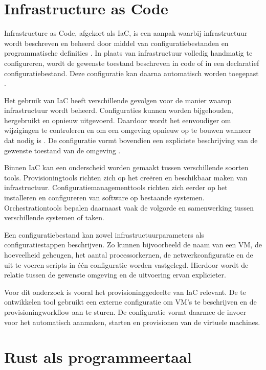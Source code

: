 \section{Infrastructure as Code}

Infrastructure as Code, afgekort als IaC, is een aanpak waarbij infrastructuur wordt beschreven en beheerd door middel van configuratiebestanden en programmatische definities \autocite{Holdsworth2025}. In plaats van infrastructuur volledig handmatig te configureren, wordt de gewenste toestand beschreven in code of in een declaratief configuratiebestand. Deze configuratie kan daarna automatisch worden toegepast \autocite{Holdsworth2025}.

Het gebruik van IaC heeft verschillende gevolgen voor de manier waarop infrastructuur wordt beheerd. Configuraties kunnen worden bijgehouden, hergebruikt en opnieuw uitgevoerd. Daardoor wordt het eenvoudiger om wijzigingen te controleren en om een omgeving opnieuw op te bouwen wanneer dat nodig is \autocite{Holdsworth2025}. De configuratie vormt bovendien een expliciete beschrijving van de gewenste toestand van de omgeving \autocite{Holdsworth2025}.

Binnen IaC kan een onderscheid worden gemaakt tussen verschillende soorten tools. Provisioningtools richten zich op het creëren en beschikbaar maken van infrastructuur. Configuratiemanagementtools richten zich eerder op het installeren en configureren van software op bestaande systemen. Orchestrationtools bepalen daarnaast vaak de volgorde en samenwerking tussen verschillende systemen of taken.

Een configuratiebestand kan zowel infrastructuurparameters als configuratiestappen beschrijven. Zo kunnen bijvoorbeeld de naam van een VM, de hoeveelheid geheugen, het aantal processorkernen, de netwerkconfiguratie en de uit te voeren scripts in één configuratie worden vastgelegd. Hierdoor wordt de relatie tussen de gewenste omgeving en de uitvoering ervan explicieter.

Voor dit onderzoek is vooral het provisioninggedeelte van IaC relevant. De te ontwikkelen tool gebruikt een externe configuratie om VM's te beschrijven en de provisioningworkflow aan te sturen. De configuratie vormt daarmee de invoer voor het automatisch aanmaken, starten en provisionen van de virtuele machines.

\section{Rust als programmeertaal}

